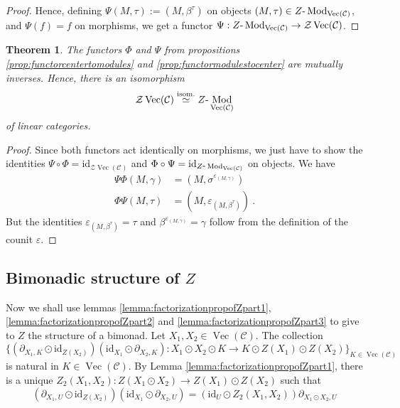\documentclass[a4paper,11pt,reqno]{amsart}
\numberwithin{equation}{section}
\newtheorem{theorem}{Theorem}[section]
\theoremstyle{remark}
\theoremstyle{definition}
\def\-{{\hbox{-}}}
\newcommand{\cC}{\mathcal C}
\newcommand{\cZ}{\mathcal Z}
\DeclareMathOperator{\Mod}{Mod}
\DeclareMathOperator{\Vect}{Vec}
\newcommand{\id}{\mathrm{id}}
\begin{document}
\begin{proof}
	Hence, defining $\Psi(M,\tau) := (M,\beta^\tau)$ on objects $(M,\tau) \in Z \- \Mod_{\Vect(\cC)}$, and $\Psi(f) = f$ on morphisms, we get a functor $\Psi: Z \- \Mod_{\Vect(\cC)} \to \cZ \Vect(\cC)$. 
\end{proof}

\begin{theorem}
	The functors $\Phi$ and $\Psi$ from propositions \ref{prop:functorcentertomodules} and \ref{prop:functormodulestocenter} are mutually inverses. Hence, there is an isomorphism
	$$\cZ \Vect(\cC) \overset{\text{isom.}}{\simeq} Z \- \Mod_{\Vect(\cC)}  $$
	of linear categories.
	\label{thm:linearisom}
\end{theorem}
\begin{proof}
	Since both functors act identically on morphisms, we just have to show the identities $\Psi \circ \Phi = \id_{\cZ \Vect(\cC)}$ and $\Phi \circ \Psi = \id_{Z \- \Mod_{\Vect(\cC)}}$ on objects. We have
	\begin{align*}
		\Psi \Phi (M,\gamma) & = (M,\sigma^{\varepsilon_{(M,\gamma)}}) \\
		\Phi \Psi (M,\tau) &= (M,\varepsilon_{(M,\beta^\tau)}) \ .
	\end{align*}
	But the identities $\varepsilon_{(M,\beta^\tau)} = \tau$ and $\beta^{\varepsilon_{(M,\gamma)}} = \gamma$ follow from the definition of the counit $\varepsilon$.
\end{proof}


\subsection{Bimonadic structure of $Z$}

Now we shall use lemmas \ref{lemma:factorizationpropofZpart1}, \ref{lemma:factorizationpropofZpart2} and \ref{lemma:factorizationpropofZpart3} to give to $Z$ the structure of a bimonad. Let $X_1,X_2 \in \Vect(\cC)$. The collection 
\[
\{(\partial_{X_1,K} \odot \id_{Z(X_2)})(\id_{X_1} \odot \partial_{X_2,K}): X_1 \odot X_2 \odot K \to K \odot Z(X_1) \odot Z(X_2)\}_{K \in \Vect(\cC)}
\]
is natural in $K \in \Vect(\cC)$. By Lemma \ref{lemma:factorizationpropofZpart1}, there is a unique $Z_2(X_1,X_2):Z(X_1 \odot X_2) \to Z(X_1) \odot Z(X_2)$ such that
\[
(\partial_{X_1,U} \odot \id_{Z(X_2)})(\id_{X_1} \odot \partial_{X_2,U}) = (\id_U \odot Z_2(X_1,X_2)) \partial_{X_1 \odot X_2,U} 
\]
\end{document}
